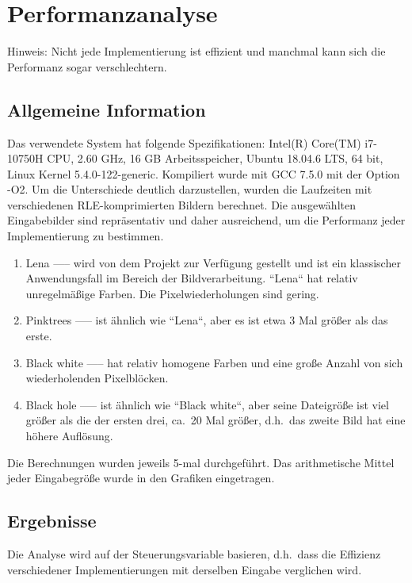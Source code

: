 \documentclass[course=erap]{aspdoc}
\begin{document}
    \section{Performanzanalyse}\label{sec:performanzanalyse}
    Hinweis: Nicht jede Implementierung ist effizient und manchmal kann sich die Performanz sogar verschlechtern.

    \subsection{Allgemeine Information}\label{subsec:allgemeine-information}
    Das verwendete System hat folgende Spezifikationen: Intel(R) Core(TM) i7-10750H CPU, 2.60 GHz, 16 GB
    Arbeitsspeicher, Ubuntu 18.04.6 LTS, 64 bit, Linux Kernel 5.4.0-122-generic.
    Kompiliert wurde mit GCC 7.5.0 mit der Option -O2.
    \newline
    \newline
    Um die Unterschiede deutlich darzustellen, wurden die Laufzeiten mit verschiedenen RLE-komprimierten
    Bildern berechnet.
    Die ausgewählten Eingabebilder sind repräsentativ und daher ausreichend, um die Performanz jeder Implementierung
    zu bestimmen.

    \begin{enumerate}
        \item Lena ----- wird von dem Projekt zur Verfügung gestellt und ist ein klassischer
        Anwendungsfall im Bereich der Bildverarbeitung.
        ``Lena`` hat relativ unregelmäßige Farben.
        Die Pixelwiederholungen sind gering.
        \item Pinktrees ----- ist ähnlich wie ``Lena``, aber es ist etwa 3 Mal größer als das erste.
        \item Black white ----- hat relativ homogene Farben und eine große Anzahl von
        sich wiederholenden Pixelblöcken.
        \item Black hole ----- ist ähnlich wie ``Black white``, aber seine Dateigröße ist viel
        größer als die der ersten drei, ca.\ 20 Mal größer, d.h.\ das zweite Bild hat eine
        höhere Auflösung.
        \noindent
    \end{enumerate}
    \noindent Die Berechnungen wurden jeweils 5-mal durchgeführt.
    Das arithmetische Mittel jeder Eingabegröße wurde in den Grafiken eingetragen.

    \subsection{Ergebnisse}\label{subsec:ergebnisse}
    Die Analyse wird auf der Steuerungsvariable basieren, d.h.\ dass die Effizienz verschiedener Implementierungen mit
    derselben Eingabe verglichen wird.
\end{document}
